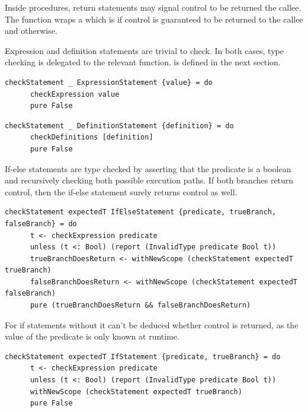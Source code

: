\documentclass[UdineBachThesis,american,11pt,draft]{PhdThesis}
\begin{document}
  Inside procedures, return statements may signal control to be returned the
  callee. The function \lstinline@checkStatement@ wraps a \lstinline@Bool@ which
  is \lstinline@True@ if control is guaranteed to be returned to the callee and
  \lstinline@False@ otherwise.

  Expression and definition statements are trivial to check. In both cases, type
  checking is delegated to the relevant function. \lstinline@checkDefinitions@
  is defined in the next section.

  \begin{lstlisting}[gobble=4,basicstyle=\ttfamily\small]
    checkStatement _ ExpressionStatement {value} = do
      checkExpression value
      pure False
  \end{lstlisting}

  \begin{lstlisting}[gobble=4,basicstyle=\ttfamily\small]
    checkStatement _ DefinitionStatement {definition} = do
      checkDefinitions [definition]
      pure False
  \end{lstlisting}

  If-else statements are type checked by asserting that the predicate is a
  boolean and recursively checking both possible execution paths. If both
  branches return control, then the if-else statement surely returns control as
  well.

  \begin{lstlisting}[gobble=4,basicstyle=\ttfamily\small]
    checkStatement expectedT IfElseStatement {predicate, trueBranch, falseBranch} = do
      t <- checkExpression predicate
      unless (t <: Bool) (report (InvalidType predicate Bool t))
      trueBranchDoesReturn <- withNewScope (checkStatement expectedT trueBranch)
      falseBranchDoesReturn <- withNewScope (checkStatement expectedT falseBranch)
      pure (trueBranchDoesReturn && falseBranchDoesReturn)
  \end{lstlisting}

  For if statements without \lstinline@else@ it can't be deduced whether control
  is returned, as the value of the predicate is only known at runtime.

  \begin{lstlisting}[gobble=4,basicstyle=\ttfamily\small]
    checkStatement expectedT IfStatement {predicate, trueBranch} = do
      t <- checkExpression predicate
      unless (t <: Bool) (report (InvalidType predicate Bool t))
      withNewScope (checkStatement expectedT trueBranch)
      pure False
  \end{lstlisting}
\end{document}
